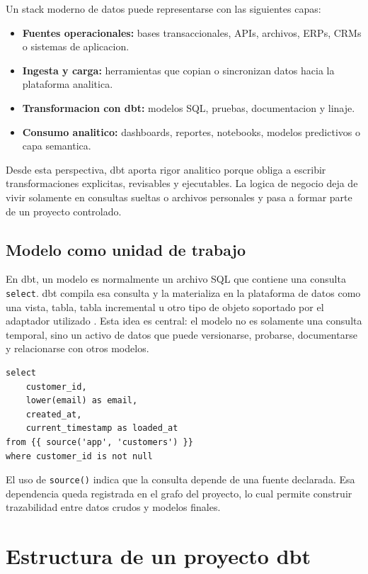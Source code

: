 \documentclass[12pt]{article}
\begin{document}
Un stack moderno de datos puede representarse con las siguientes capas:

\begin{itemize}[leftmargin=*]
\item \textbf{Fuentes operacionales:} bases transaccionales, APIs, archivos, ERPs, CRMs o sistemas de aplicacion.
\item \textbf{Ingesta y carga:} herramientas que copian o sincronizan datos hacia la plataforma analitica.
\item \textbf{Transformacion con dbt:} modelos SQL, pruebas, documentacion y linaje.
\item \textbf{Consumo analitico:} dashboards, reportes, notebooks, modelos predictivos o capa semantica.
\end{itemize}

Desde esta perspectiva, dbt aporta rigor analitico porque obliga a escribir transformaciones explicitas, revisables y ejecutables. La logica de negocio deja de vivir solamente en consultas sueltas o archivos personales y pasa a formar parte de un proyecto controlado.

\subsection{Modelo como unidad de trabajo}
En dbt, un modelo es normalmente un archivo SQL que contiene una consulta \texttt{select}. dbt compila esa consulta y la materializa en la plataforma de datos como una vista, tabla, tabla incremental u otro tipo de objeto soportado por el adaptador utilizado \cite{dbt_models}. Esta idea es central: el modelo no es solamente una consulta temporal, sino un activo de datos que puede versionarse, probarse, documentarse y relacionarse con otros modelos.

\begin{lstlisting}[style=sql, caption={Ejemplo simple de modelo dbt en SQL}]
select
    customer_id,
    lower(email) as email,
    created_at,
    current_timestamp as loaded_at
from {{ source('app', 'customers') }}
where customer_id is not null
\end{lstlisting}

El uso de \texttt{source()} indica que la consulta depende de una fuente declarada. Esa dependencia queda registrada en el grafo del proyecto, lo cual permite construir trazabilidad entre datos crudos y modelos finales.

\section{Estructura de un proyecto dbt}
\end{document}
